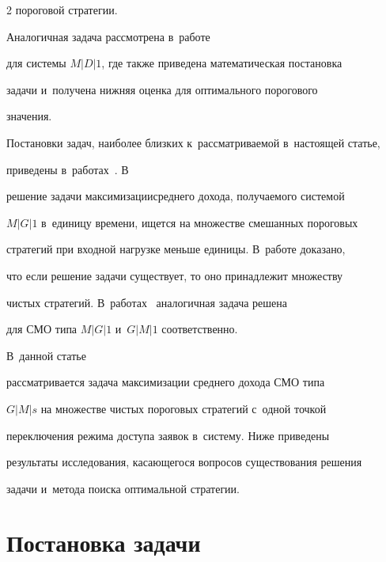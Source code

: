 \begin{multicols}{2}
пороговой стратегии. 





Аналогичная задача рас\-смот\-ре\-на в~работе~\cite{4-aga}


для сис\-те\-мы $M|D|1$, где также приведена математическая постановка


задачи и~получена нижняя оценка для оптимального порогового


значения. 





Постановки задач, наиболее близких к~рас\-смат\-ри\-ва\-емой в~настоящей статье, 


приведены в~работах~\cite{5-aga, 6-aga, 7-aga}. В~\cite{5-aga}


решение задачи максимизации\linebreak средне\-го дохода, получаемого сис\-те\-мой


$M|G|1$ в~единицу времени, ищется на множестве смешанных пороговых


стратегий при входной нагрузке меньше единицы. В~работе доказано,


что если решение задачи существует, то оно принадлежит множеству


чистых стратегий. В~работах~\cite{6-aga, 7-aga} аналогичная задача решена


для СМО типа $M|G|1$ и~$G|M|1$ соответственно. 





В~данной статье


рассматривается задача максимизации среднего дохода СМО типа


$G|M|s$ на множестве чистых пороговых стратегий с~одной точкой


переключения режима доступа заявок в~сис\-те\-му. Ниже приведены


результаты исследования, касающегося вопросов существования решения


задачи и~метода поиска оптимальной стратегии.











\section{Постановка задачи}






\end{multicols}
